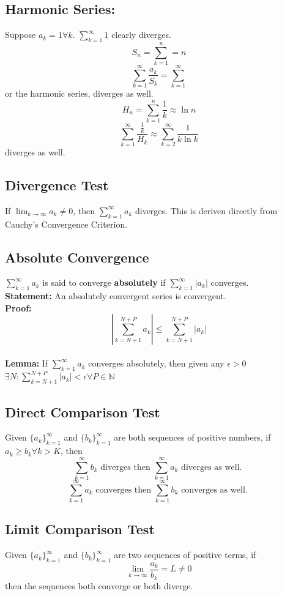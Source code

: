 \documentclass[../main.tex]{subfiles}
\begin{document}
    \subsection{Harmonic Series: }
        Suppose $a_{k}=1\forall k$. $\sum_{k=1}^{\infty}1$ clearly diverges.
        $$S_{n}=\sum_{k=1}^{n}=n$$
        $$\sum_{k=1}^{\infty}\frac{a_{k}}{S_{k}}=\sum_{k=1}^{\infty}$$
        or the harmonic series, diverges as well.
        $$H_{n}=\sum_{k=1}^{n}\frac{1}{k}\approx\ln{n}$$
        $$\sum_{k=1}^{\infty}\frac{\frac{1}{k}}{H_{k}}\approx\sum_{k=2}^{\infty}\frac{1}{k\ln k}$$
        diverges as well.
    
    \subsection{Divergence Test}
        If $\lim_{k\rightarrow\infty}a_{k}\neq0$, then $\sum_{k=1}^{\infty}a_{k}$ diverges. This is deriven directly from Cauchy's Convergence Criterion.

    \subsection{Absolute Convergence}
        $\sum_{k=1}^{\infty}a_{k}$ is said to converge \textbf{absolutely} if $\sum_{k=1}^{\infty}|a_{k}|$ converges.\\
        \textbf{Statement: } An absolutely convergent series is convergent.\\
        \textbf{Proof: } $$|\sum_{k=N+1}^{N+P}a_{k}|\leq\sum_{k=N+1}^{N+P}|a_{k}|$$\\
        \textbf{Lemma: } If $\sum_{k=1}^{\infty}a_{k}$ converges absolutely, then given any $\epsilon > 0$ $\exists N : \sum_{k=N+1}^{N+P}|a_{k}|<\epsilon \forall P \in \mathbb{N}$
    
    \subsection{Direct Comparison Test}
        Given $\{a_{k}\}_{k=1}^{\infty}$ and $\{b_{k}\}_{k=1}^{\infty}$ are both sequences of positive numbers, if $a_{k}\geq b_{k} \forall k > K$, then
        $$\sum_{k=1}^{\infty}b_{k} \text{ diverges then } \sum_{k=1}^{\infty}a_{k}\text{ diverges as well. }$$
        $$\sum_{k=1}^{\infty}a_{k} \text{ converges then } \sum_{k=1}^{\infty}b_{k}\text{ converges as well. }$$

    \subsection{Limit Comparison Test}
        Given $\{a_{k}\}_{k=1}^{\infty}$ and $\{b_{k}\}_{k=1}^{\infty}$ are two sequences of positive terms, if
        $$\lim_{k\rightarrow\infty}\frac{a_{k}}{b_{k}}=L\neq 0$$
        then the sequences both converge or both diverge.
\end{document}
